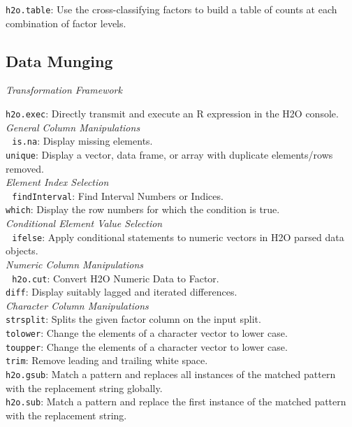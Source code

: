 \documentclass[11pt]{article}
\begin{document}
\begin{enumerate}
{{{\texttt{h2o.table}}: Use the cross-classifying factors to build a table of counts at each combination of factor levels.\\

\subsection{Data Munging}

\textit{Transformation Framework}

{\texttt{h2o.exec}}: Directly transmit and execute an R expression in the H2O console.\\

\textit{General Column Manipulations}\\ 
{\texttt{is.na}}: Display missing elements.  \\
{\texttt{unique}}: Display a vector, data frame, or array with duplicate elements/rows removed.\\

\textit{Element Index Selection}\\ 
{\texttt{findInterval}}: Find Interval Numbers or Indices.\\
{\texttt{which}}: Display the row numbers for which the condition is true.\\

\textit{Conditional Element Value Selection}\\ 
{\texttt{ifelse}}: Apply conditional statements to numeric vectors in H2O parsed data objects.\\

\textit{Numeric Column Manipulations}\\ 
{\texttt{h2o.cut}}: Convert H2O Numeric Data to Factor. \\
{\texttt{diff}}: Display suitably lagged and iterated differences.\\

\textit{Character Column Manipulations}\\

{\texttt{strsplit}}: Splits the given factor column on the input split. \\
{\texttt{tolower}}: Change the elements of a character vector to lower case. \\
{\texttt{toupper}}: Change the elements of a character vector to lower case. \\
{\texttt{trim}}: Remove leading and trailing white space.\\
{\texttt{h2o.gsub}}: Match a pattern and replaces all instances of the matched pattern with the replacement string globally. \\
{\texttt{h2o.sub}}: Match a pattern and replace the first instance of the matched pattern with the replacement string.\\

}}
\end{enumerate}
\end{document}
